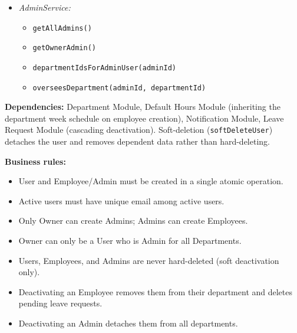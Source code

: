 \documentclass[11pt,a4paper]{article}
\begin{document}
\begin{itemize}[leftmargin=1.5em]
\begin{itemize}[noitemsep, leftmargin=1.5em]
        \item \texttt{getEmployeesForAdmin(id)}
        \item \texttt{requireAdminAccessToEmployee(adminId, employeeId)}
        \item \texttt{findActiveEmployeeIds()}
        \item \texttt{hasEmployeesInDepartment(departmentId)}
        \item \texttt{getWeekScheduleId} / \texttt{assignWeekSchedule}
    \end{itemize}
    \item \textit{AdminService:}
    \begin{itemize}[noitemsep, leftmargin=1.5em]
        \item \texttt{getAllAdmins()}
        \item \texttt{getOwnerAdmin()}
        \item \texttt{departmentIdsForAdminUser(adminId)}
        \item \texttt{overseesDepartment(adminId, departmentId)}
    \end{itemize}
\end{itemize}

\textbf{Dependencies:} Department Module, Default Hours Module (inheriting the department week schedule on employee creation), Notification Module, Leave Request Module (cascading deactivation). Soft-deletion (\texttt{softDeleteUser}) detaches the user and removes dependent data rather than hard-deleting.

\textbf{Business rules:}
\begin{itemize}[leftmargin=1.5em]
    \item User and Employee/Admin must be created in a single atomic operation.
    \item Active users must have unique email among active users.
    \item Only Owner can create Admins; Admins can create Employees.
    \item Owner can only be a User who is Admin for all Departments.
    \item Users, Employees, and Admins are never hard-deleted (soft deactivation only).
    \item Deactivating an Employee removes them from their department and deletes pending leave requests.
    \item Deactivating an Admin detaches them from all departments.
\end{itemize}
\end{document}
